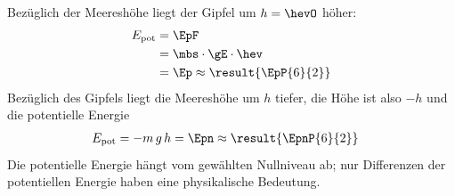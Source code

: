 Bezüglich der Meereshöhe liegt der Gipfel um $h = \hevO$ höher:
\begin{align}
 E_\mathrm{pot} &= \EpF \\
   &= \mbs\cdot\gE\cdot\hev \\
   &= \Ep \approx \result{\EpP{6}{2}}
\end{align}
Bezüglich des Gipfels liegt die Meereshöhe um $h$ tiefer, die Höhe ist also $-h$ und die potentielle Energie
\begin{align}
 E_\mathrm{pot} &= -m\,g\,h = \Epn \approx \result{\EpnP{6}{2}}
\end{align}
Die potentielle Energie hängt vom gewählten Nullniveau ab; nur Differenzen der potentiellen Energie haben eine physikalische Bedeutung.
